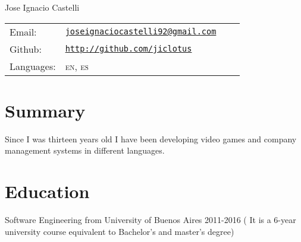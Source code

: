 \documentclass[letterpaper]{article}
\def\name{Jose Ignacio Castelli}
\newenvironment{no-indent-itemize}{
  \begin{list}{}{
    \setlength{\leftmargin}{0em}
  }
}{
  \end{list}
}
\begin{document}
{\huge \name}

\bigskip
\begin{minipage}{0.45\linewidth}
  \begin{tabular}{llll}
    Email: & \href{mailto:joseignaciocastelli92@gmail.com}{\tt joseignaciocastelli92@gmail.com} \\
    Github: &\href{http://github.com/jiclotus}{\tt http://github.com/jiclotus}\\
    Languages: & \textsc{en}, \textsc{es}
  \end{tabular}
\end{minipage}


\section*{Summary}
\begin{no-indent-itemize}
    \item Since I was thirteen years old I have been developing video games and company management systems in different languages. 
\end{no-indent-itemize}

\section*{Education}
\begin{no-indent-itemize}
  \item  Software Engineering from University of Buenos Aires 2011-2016 ( It is a 6-year university course equivalent to Bachelor's and master's degree) 
\end{no-indent-itemize}
\end{document}
